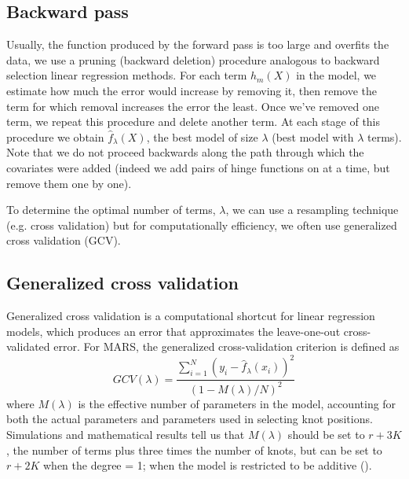 \documentclass[12pt]{article}
\begin{document}
\subsection{Backward pass} %
\label{sub:backward_pass}

Usually, the function produced by the forward pass is too large and overfits the data, we use a pruning (backward deletion) procedure analogous to backward selection linear regression methods. For each term $h_{m}(X)$ in the model, we estimate how much the error would increase by removing it, then remove the term for which removal increases the error the least. Once we've removed one term, we repeat this procedure and delete another term. At each stage of this procedure we obtain $\hat{f}_{\lambda}(X)$, the best model of size $\lambda$ (best model with $\lambda$ terms). Note that we do not proceed backwards along the path through which the covariates were added (indeed we add pairs of hinge functions on at a time, but remove them one by one).

To determine the optimal number of terms, $\lambda$, we can use a resampling technique (e.g. cross validation) but for computationally efficiency, we often use generalized cross validation (GCV).


\subsection{Generalized cross validation} %
\label{sub:generalized_cross_validation}

Generalized cross validation is a computational shortcut for linear regression models, which produces an error that approximates the leave-one-out cross-validated error. For MARS, the generalized cross-validation criterion is defined as
\begin{equation}
  GCV(\lambda) =
    \frac{
      \sum_{i = 1}^{N}(y_{i} - \hat{f}_{\lambda}(x_{i}))^2
    }{
      (1 - M(\lambda)/N)^2
    }
\end{equation}
where $M(\lambda)$ is the effective number of parameters in the model, accounting for both the actual parameters and parameters used in selecting knot positions. Simulations and mathematical results tell us that $M(\lambda)$ should be set to $r + 3K$, the number of terms plus three times the number of knots, but can be set to $r + 2K$ when the degree = 1; when the model is restricted to be additive (\cite{esl}).

\end{document}
